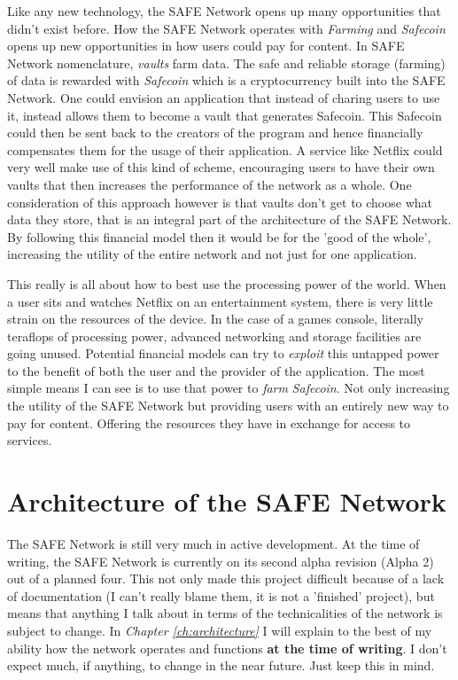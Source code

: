 Like any new technology, the SAFE Network opens up many opportunities that didn't exist before. How the SAFE Network operates with \textit{Farming} and \textit{Safecoin} opens up new opportunities in how users could pay for content. In SAFE Network nomenclature, \textit{vaults} farm data. The safe and reliable storage (farming) of data is rewarded with \textit{Safecoin} which is a cryptocurrency built into the SAFE Network. One could envision an application that instead of charing users to use it, instead allows them to become a vault that generates Safecoin. This Safecoin could then be sent back to the creators of the program and hence financially compensates them for the usage of their application. A service like Netflix could very well make use of this kind of scheme, encouraging users to have their own vaults that then increases the performance of the network as a whole. One consideration of this approach however is that vaults don't get to choose what data they store, that is an integral part of the architecture of the SAFE Network. By following this financial model then it would be for the 'good of the whole', increasing the utility of the entire network and not just for one application.

This really is all about how to best use the processing power of the world. When a user sits and watches Netflix on an entertainment system, there is very little strain on the resources of the device. In the case of a games console, literally teraflops of processing power, advanced networking and storage facilities are going unused. Potential financial models can try to \textit{exploit} this untapped power to the benefit of both the user and the provider of the application. The most simple means I can see is to use that power to \textit{farm} \textit{Safecoin}. Not only increasing the utility of the SAFE Network but providing users with an entirely new way to pay for content. Offering the resources they have in exchange for access to services.

\section{Architecture of the SAFE Network}

The SAFE Network is still very much in active development. At the time of writing, the SAFE Network is currently on its second alpha revision (Alpha 2) out of a planned four. This not only made this project difficult because of a lack of documentation (I can't really blame them, it is not a 'finished' project), but means that anything I talk about in terms of the technicalities of the network is subject to change. In \textit{Chapter \ref{ch:architecture}} I will explain to the best of my ability how the network operates and functions \textbf{at the time of writing}. I don't expect much, if anything, to change in the near future. Just keep this in mind.
